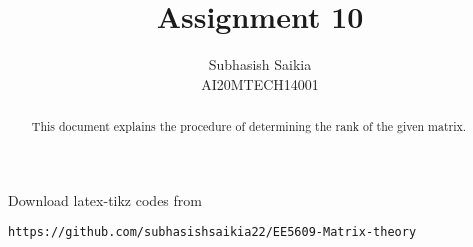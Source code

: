 \documentclass[journal,12pt]{IEEEtran}
\begin{document}
\onecolumn

\newtheorem{theorem}{Theorem}[section]
\newtheorem{problem}{Problem}
\newtheorem{proposition}{Proposition}[section]
\newtheorem{lemma}{Lemma}[section]
\newtheorem{corollary}[theorem]{Corollary}
\newtheorem{example}{Example}[section]
\newtheorem{definition}[problem]{Definition}

\newcommand{\BEQA}{\begin{eqnarray}}
\newcommand{\EEQA}{\end{eqnarray}}
\newcommand{\define}{\stackrel{\triangle}{=}}

\raggedbottom
\setlength{\parindent}{0pt}
\providecommand{\mbf}{\mathbf}
\providecommand{\pr}[1]{\ensuremath{\Pr\left(#1\right)}}
\providecommand{\qfunc}[1]{\ensuremath{Q\left(#1\right)}}
\providecommand{\sbrak}[1]{\ensuremath{{}\left[#1\right]}}
\providecommand{\lsbrak}[1]{\ensuremath{{}\left[#1\right.}}
\providecommand{\rsbrak}[1]{\ensuremath{{}\left.#1\right]}}
\providecommand{\brak}[1]{\ensuremath{\left(#1\right)}}
\providecommand{\lbrak}[1]{\ensuremath{\left(#1\right.}}
\providecommand{\rbrak}[1]{\ensuremath{\left.#1\right)}}
\providecommand{\cbrak}[1]{\ensuremath{\left\{#1\right\}}}
\providecommand{\lcbrak}[1]{\ensuremath{\left\{#1\right.}}
\providecommand{\rcbrak}[1]{\ensuremath{\left.#1\right\}}}
\theoremstyle{remark}
\newtheorem{rem}{Remark}
\newcommand{\sgn}{\mathop{\mathrm{sgn}}}
\providecommand{\system}{\overset{\mathcal{H}}{ \longleftrightarrow}}
\newcommand{\solution}{\noindent \textbf{Solution: }}
\newcommand{\cosec}{\,\text{cosec}\,}
\providecommand{\dec}[2]{\ensuremath{\overset{#1}{\underset{#2}{\gtrless}}}}
\newcommand{\myvec}[1]{\ensuremath{\begin{pmatrix}#1\end{pmatrix}}}
\newcommand{\mydet}[1]{\ensuremath{\begin{vmatrix}#1\end{vmatrix}}}
\makeatletter
{}
\makeatother
\let\StandardTheFigure\thefigure
\let\vec\mathbf
\renewcommand{\thefigure}{\theproblem}
\def\putbox#1#2#3{\makebox[0in][l]{\makebox[#1][l]{}\raisebox{\baselineskip}[0in][0in]{\raisebox{#2}[0in][0in]{#3}}}}
     \def\rightbox#1{\makebox[0in][r]{#1}}
     \def\centbox#1{\makebox[0in]{#1}}
     \def\topbox#1{\raisebox{-\baselineskip}[0in][0in]{#1}}
     \def\midbox#1{\raisebox{-0.5\baselineskip}[0in][0in]{#1}}
\vspace{3cm}
\title{Assignment 10}
\author{Subhasish Saikia\\AI20MTECH14001}
\maketitle
\begin{abstract}
This document explains the procedure of determining the rank of the given matrix.
\end{abstract}
\bigskip
\renewcommand{\thefigure}{\theenumi}
\renewcommand{\thetable}{\theenumi}
Download latex-tikz codes from
\begin{lstlisting}
https://github.com/subhasishsaikia22/EE5609-Matrix-theory
\end{lstlisting}
\end{document}
